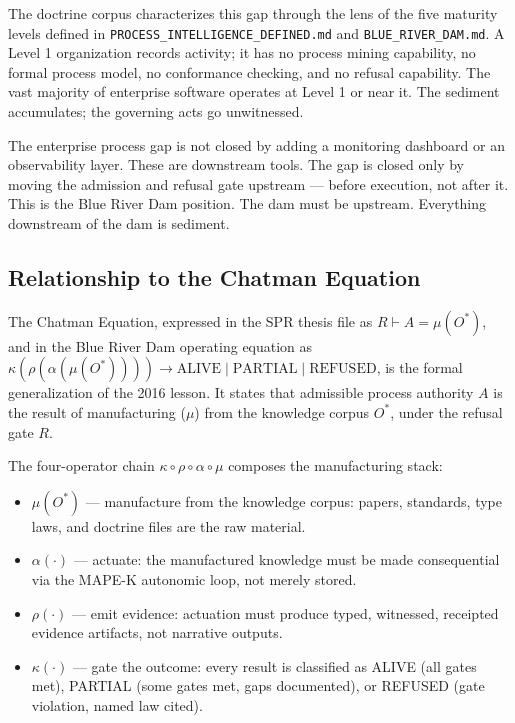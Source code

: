 The doctrine corpus characterizes this gap through the lens of the five maturity levels
defined in \texttt{PROCESS\_INTELLIGENCE\_DEFINED.md} and \texttt{BLUE\_RIVER\_DAM.md}. A
Level 1 organization records activity; it has no process mining capability, no formal process
model, no conformance checking, and no refusal capability. The vast majority of enterprise
software operates at Level 1 or near it. The sediment accumulates; the governing acts go
unwitnessed.

The enterprise process gap is not closed by adding a monitoring dashboard or an observability
layer. These are downstream tools. The gap is closed only by moving the admission and refusal
gate upstream --- before execution, not after it. This is the Blue River Dam position. The
dam must be upstream. Everything downstream of the dam is sediment.

\subsection{Relationship to the Chatman Equation}
\label{sec:doctrine-lineage-chatman-equation}

The Chatman Equation, expressed in the SPR thesis file as $R \vdash A = \mu(O^*)$, and in
the Blue River Dam operating equation as $\kappa(\rho(\alpha(\mu(O^*)))) \to \text{ALIVE}
\mid \text{PARTIAL} \mid \text{REFUSED}$, is the formal generalization of the 2016 lesson.
It states that admissible process authority $A$ is the result of manufacturing ($\mu$) from
the knowledge corpus $O^*$, under the refusal gate $R$.

The four-operator chain $\kappa \circ \rho \circ \alpha \circ \mu$ composes the
manufacturing stack:
\begin{itemize}
  \item $\mu(O^*)$ --- manufacture from the knowledge corpus: papers, standards, type laws,
    and doctrine files are the raw material.
  \item $\alpha(\cdot)$ --- actuate: the manufactured knowledge must be made consequential via
    the MAPE-K autonomic loop, not merely stored.
  \item $\rho(\cdot)$ --- emit evidence: actuation must produce typed, witnessed, receipted
    evidence artifacts, not narrative outputs.
  \item $\kappa(\cdot)$ --- gate the outcome: every result is classified as ALIVE (all gates
    met), PARTIAL (some gates met, gaps documented), or REFUSED (gate violation, named law
    cited).
\end{itemize}

